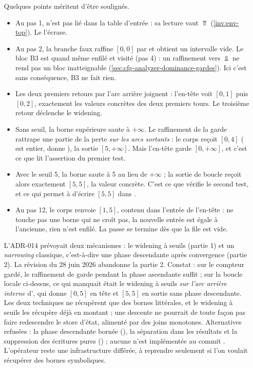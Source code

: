 Quelques points méritent d'être soulignés.
\begin{itemize}
  \item Au pas 1,  n'est pas lié dans la table d'entrée : sa lecture
    vaut $\Top$ (\cref{inv:env-top}). Le  l'écrase.
  \item Au pas 2, la branche \og faux\fg{} raffine $[0,0]$ par
     et obtient un intervalle vide. Le bloc B3 est quand même
    enfilé et visité (pas 4) : un raffinement vers $\Bot$ ne rend pas un
    bloc inatteignable (\cref{sec:cfg-analyzer-dominance-gardes}). Ici c'est
    sans conséquence, B3 ne fait rien.
  \item Les deux premiers retours par l'arc arrière joignent : l'en-tête voit
    $[0,1]$ puis $[0,2]$, exactement les valeurs concrètes des deux premiers
    tours. Le troisième retour déclenche le widening.
  \item Sans seuil, la borne supérieure saute à $+\infty$. Le raffinement de
    la garde rattrape une partie de la perte \emph{sur les arcs sortants} :
    le corps reçoit $[0,4]$ ( est entier,  donne
    ), la sortie $[5,+\infty]$. Mais l'en-tête garde
    $[0,+\infty]$, et c'est ce que lit l'assertion du premier test.
  \item Avec le seuil 5, la borne saute à 5 au lieu de $+\infty$ ; la sortie
    de boucle reçoit alors exactement $[5,5]$, la valeur concrète. C'est ce
    que vérifie le second test, et ce qui permet à 
    d'écrire $[5,5]$ dans .
  \item Au pas 12, le corps renvoie $[1,5]$, contenu dans l'entrée de
    l'en-tête :  ne touche pas une borne qui ne croît pas, la
    nouvelle entrée est égale à l'ancienne, rien n'est enfilé. La passe se
    termine dès que la file est vide.
\end{itemize}

\begin{decision}[ADR-014]
  L'ADR-014 prévoyait deux mécanismes : le widening à seuils (partie 1) et un
  \emph{narrowing} classique, c'est-à-dire une phase descendante après
  convergence (partie 2). La révision du 28 juin 2026 abandonne la partie 2.
  Constat : sur le compteur gardé, le raffinement de garde pendant la phase
  ascendante suffit ; sur la boucle locale ci-dessus, ce qui manquait était
  le widening à seuils \emph{sur l'arc arrière interne} d',
  qui donne $[0,5]$ en tête et $[5,5]$ en sortie sans phase descendante. Les
  deux techniques ne récupèrent que des bornes littérales, et le widening à
  seuils les récupère déjà en montant ; une descente ne pourrait de toute
  façon pas faire redescendre le store d'état, alimenté par des joins
  monotones. Alternatives refusées : la phase descendante bornée
  (), la séparation  dans les
  résultats et la suppression des écritures pures ()
  ; aucune n'est implémentée au commit \snapshotCommit. L'opérateur
   reste une infrastructure différée, à reprendre seulement si
  l'on voulait récupérer des bornes symboliques.
\end{decision}


